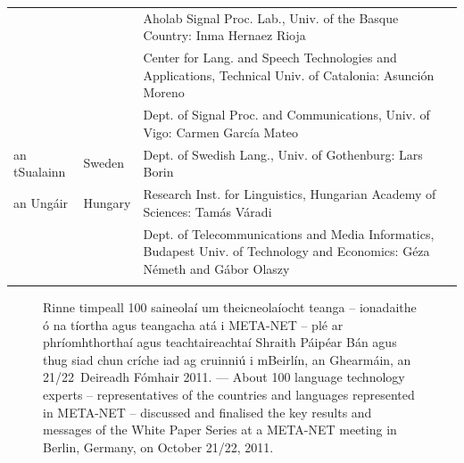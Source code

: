 \documentclass[]{../../metanetpaper}
\begin{document}
\begin{longtable}{llp{105mm}}
  & & Aholab Signal Proc. Lab., Univ. of the Basque Country: Inma Hernaez Rioja \\ \addlinespace 
  & & Center for Lang. and Speech Technologies and Applications, Technical Univ. of Catalonia: Asunción Moreno \\ \addlinespace 
  & & Dept. of Signal Proc. and Communications, Univ. of Vigo: Carmen García Mateo \\ \addlinespace 
  an tSualainn & \textcolor{grey1}{Sweden} & Dept. of Swedish Lang., Univ. of Gothenburg: Lars Borin \\ \addlinespace 
  an Ungáir & \textcolor{grey1}{Hungary} & Research Inst. for Linguistics, Hungarian Academy of Sciences: Tamás Váradi\\  \addlinespace
  & & Dept. of Telecommunications and Media Informatics, Budapest Univ. of Technology and Economics: Géza Németh and Gábor Olaszy\\ \addlinespace
  
\end{longtable}
\normalsize

\renewcommand*{\figureformat}{}
\renewcommand*{\captionformat}{}

\begin{figure}[htbp]
  \center
  \caption{Rinne timpeall 100 saineolaí um theicneolaíocht teanga -- ionadaithe ó na tíortha agus teangacha atá i META-NET -- plé ar phríomhthorthaí agus teachtaireachtaí Shraith Páipéar Bán agus thug siad chun críche iad ag cruinniú i mBeirlín, an Ghearmáin, an 21/22~Deireadh Fómhair 2011. --- \textcolor{grey1}{About 100 language technology experts -- representatives of the countries and languages represented in META-NET -- discussed and finalised the key results and messages of the White Paper Series at a META-NET meeting in Berlin, Germany, on October 21/22, 2011.}} %
\end{figure}

\cleardoublepage

\label{whitepaperseries}
\end{document}
